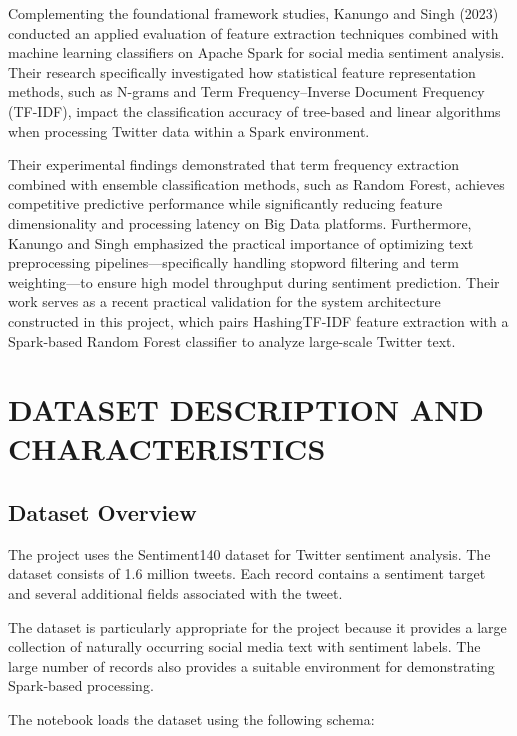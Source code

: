 \documentclass[12pt,a4paper]{article}
\begin{document}
Complementing the foundational framework studies, Kanungo and Singh (2023) conducted an applied evaluation of feature extraction techniques combined with machine learning classifiers on Apache Spark for social media sentiment analysis. Their research specifically investigated how statistical feature representation methods, such as N-grams and Term Frequency--Inverse Document Frequency (TF-IDF), impact the classification accuracy of tree-based and linear algorithms when processing Twitter data within a Spark environment.

Their experimental findings demonstrated that term frequency extraction combined with ensemble classification methods, such as Random Forest, achieves competitive predictive performance while significantly reducing feature dimensionality and processing latency on Big Data platforms. Furthermore, Kanungo and Singh emphasized the practical importance of optimizing text preprocessing pipelines---specifically handling stopword filtering and term weighting---to ensure high model throughput during sentiment prediction. Their work serves as a recent practical validation for the system architecture constructed in this project, which pairs HashingTF-IDF feature extraction with a Spark-based Random Forest classifier to analyze large-scale Twitter text.


\newpage
\section{DATASET DESCRIPTION AND CHARACTERISTICS}

\subsection{Dataset Overview}

The project uses the Sentiment140 dataset for Twitter sentiment analysis. The dataset consists of 1.6 million tweets. Each record contains a sentiment target and several additional fields associated with the tweet.

The dataset is particularly appropriate for the project because it provides a large collection of naturally occurring social media text with sentiment labels. The large number of records also provides a suitable environment for demonstrating Spark-based processing.

The notebook loads the dataset using the following schema:
\end{document}
